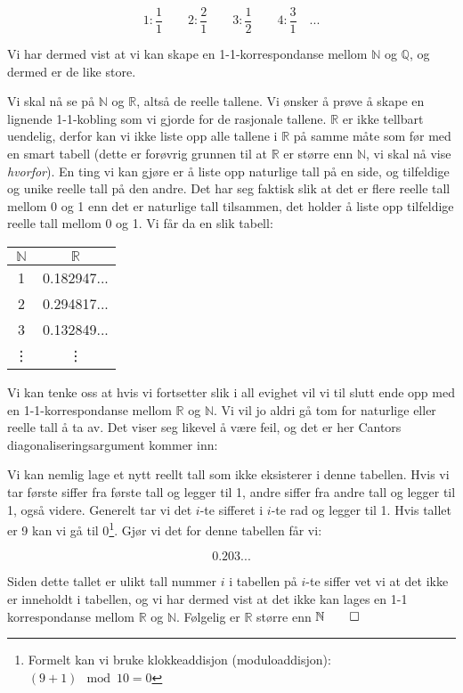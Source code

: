 \[ 1: \frac{1}{1} \quad\quad 2: \frac{2}{1} \quad\quad 3: \frac{1}{2} \quad\quad 4: \frac{3}{1} \quad ... \]

Vi har dermed vist at vi kan skape en 1-1-korrespondanse mellom $ \mathbb{N} $ og $ \mathbb{Q} $, og dermed er de like store. 

Vi skal nå se på $ \mathbb{N} $ og $ \mathbb{R} $, altså de reelle tallene. Vi ønsker å prøve å skape en lignende 1-1-kobling som vi gjorde for de rasjonale tallene. $ \mathbb{R} $ er ikke tellbart uendelig, derfor kan vi ikke liste opp alle tallene i $ \mathbb{R} $ på samme måte som før med en smart tabell (dette er forøvrig grunnen til at $ \mathbb{R} $ er større enn $ \mathbb{N} $, vi skal nå vise \emph{hvorfor}). En ting vi kan gjøre er å liste opp naturlige tall på en side, og tilfeldige og unike reelle tall på den andre. Det har seg faktisk slik at det er flere reelle tall mellom 0 og 1 enn det er naturlige tall tilsammen, det holder å liste opp tilfeldige reelle tall mellom 0 og 1. Vi får da en slik tabell:

\begin{center}
\begin{tabular}{c | c}
$ \mathbb{N} $ & $ \mathbb{R} $ \\
\hline
1 & 0.182947... \\
2 & 0.294817... \\
3 & 0.132849... \\
\vdots & \vdots
\end{tabular}
\end{center}

Vi kan tenke oss at hvis vi fortsetter slik i all evighet vil vi til slutt ende opp med en 1-1-korrespondanse mellom $ \mathbb{R} $ og $ \mathbb{N} $. Vi vil jo aldri gå tom for naturlige eller reelle tall å ta av. Det viser seg likevel å være feil, og det er her Cantors diagonaliseringsargument kommer inn:

Vi kan nemlig lage et nytt reellt tall som ikke eksisterer i denne tabellen. Hvis vi tar første siffer fra første tall og legger til 1, andre siffer fra andre tall og legger til 1, også videre. Generelt tar vi det $ i $-te sifferet i $ i $-te rad og legger til 1. Hvis tallet er 9 kan vi gå til 0\footnote{Formelt kan vi bruke klokkeaddisjon (moduloaddisjon): $ (9 + 1) \mod{10}  = 0 $}. Gjør vi det for denne tabellen får vi:

\[ 0.203...  \]

Siden dette tallet er ulikt tall nummer $ i $ i tabellen på $ i $-te siffer vet vi at det ikke er inneholdt i tabellen, og vi har dermed vist at det ikke kan lages en 1-1 korrespondanse mellom $ \mathbb{R} $ og $ \mathbb{N} $. Følgelig er $ \mathbb{R} $ større enn $ \mathbb{N} \hfill\qed$ 



